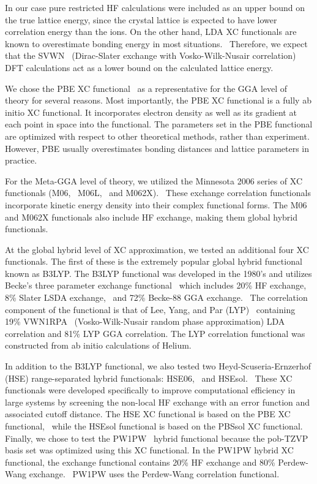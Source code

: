 \documentclass[titlepage,11pt]{article}
\begin{document}
In our case pure restricted HF calculations were included as an upper bound on the true lattice energy, since the crystal lattice is expected to have lower correlation energy than the ions. On the other hand, LDA XC functionals are known to overestimate bonding energy in most situations.~\cite{ernzerhof1997coupling,he2014accuracy} Therefore, we expect that the SVWN~\cite{dirac_1930,Vosko1980} (Dirac-Slater exchange with Vosko-Wilk-Nusair correlation) DFT calculations act as a lower bound on the calculated lattice energy.

We chose the PBE XC functional~\cite{Perdew1996} as a representative for the GGA level of theory for several reasons. Most importantly, the PBE XC functional is a fully ab initio XC functional. It incorporates electron density as well as its gradient at each point in space into the functional. The parameters set in the PBE functional are optimized with respect to other theoretical methods, rather than experiment. However, PBE usually overestimates bonding distances and lattice parameters in practice.~\cite{he2014accuracy}

For the Meta-GGA level of theory, we utilized the Minnesota 2006 series of XC functionals (M06,~\cite{Zhao2008} M06L,~\cite{Zhao2006} and M062X).~\cite{Zhao2008} These exchange correlation functionals incorporate kinetic energy density into their complex functional forms. The M06 and M062X functionals also include HF exchange, making them global hybrid functionals.

At the global hybrid level of XC approximation, we tested an additional four XC functionals. The first of these is the extremely popular global hybrid functional known as B3LYP. The B3LYP functional was developed in the 1980's and utilizes Becke's three parameter exchange functional~\cite{Becke1993} which includes 20\% HF exchange, 8\% Slater LSDA exchange,~\cite{dirac_1930} and 72\% Becke-88 GGA exchange.~\cite{becke1988} The correlation component of the functional is that of Lee, Yang, and Par (LYP)~\cite{lee1988} containing 19\% VWN1RPA~\cite{Vosko1980} (Vosko-Wilk-Nusair random phase approximation) LDA correlation and 81\% LYP GGA correlation. The LYP correlation functional was constructed from ab initio calculations of Helium.

In addition to the B3LYP functional, we also tested two Heyd-Scuseria-Ernzerhof (HSE) range-separated hybrid functionals: HSE06,~\cite{krukau2006} and HSEsol.~\cite{schimka2011} These XC functionals were developed specifically to improve computational efficiency in large systems by screening the non-local HF exchange with an error function and associated cutoff distance. The HSE XC functional is based on the PBE XC functional,~\cite{Perdew1996} while the HSEsol functional is based on the PBSsol XC functional.~\cite{perdew2008PBEsol} Finally, we chose to test the PW1PW~\cite{PW1PW} hybrid functional because the pob-TZVP basis set was optimized using this XC functional. In the PW1PW hybrid XC functional, the exchange functional contains 20\% HF exchange and 80\% Perdew-Wang exchange.~\cite{perdew1992pair} PW1PW uses the Perdew-Wang correlation functional.~\cite{perdew1992pair}
\end{document}
